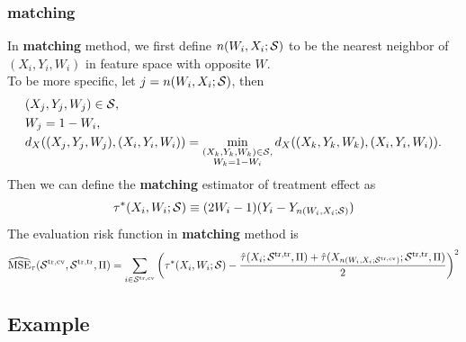 \documentclass[11pt]{article}
\newcommand{\calp}{{\Pi}}
\newcommand{\cals}{{\cal S}}
\newcommand{\mse}{{\rm MSE}}
\newcommand{\train}{{\rm tr}}
\newcommand{\tcv}{{\rm cv}}
\begin{document}
\subsubsection{matching}
In \textbf{matching} method, we first define $n(W_i, X_i; \cals)$ to be the nearest neighbor of $(X_i, Y_i, W_i)$ in feature space with opposite $W$.\\
To be more specific, let $j = n(W_i, X_i; \cals)$, then
\begin{align*}
 & (X_j, Y_j, W_j) \in \cals, \\
 & W_j = 1 - W_i,\\
 & d_X((X_j, Y_j, W_j), (X_i, Y_i, W_i)) = \min_{\substack{
 (X_k, Y_k, W_k) \in \cals,\\ W_k = 1 - W_i }} d_X((X_k, Y_k, W_k), (X_i, Y_i, W_i)).
\end{align*}
Then we can define the \textbf{matching} estimator of treatment effect as
\[\tau^*(X_i, W_i; \cals) \equiv (2W_i - 1) (Y_i - Y_{n(W_i, X_i; \cals)})\]
The evaluation risk function in \textbf{matching} method is
\[
\widehat\mse_{\tau}(\cals^{\train, \tcv}, \cals^{\train, \train}, \calp) = \sum_{i \in \cals^{\train, \tcv}}\left(\tau^*(X_i, W_i; \cals) - \frac{\hat{\tau}(X_i; \cals^{\train, \train}, \calp) + \hat{\tau}(X_{n(W_i, X_i; \cals^{\train, \tcv})}; \cals^{\train, \train}, \calp )}{2}\right)^2
\]
\subsection{Example}
\end{document}
